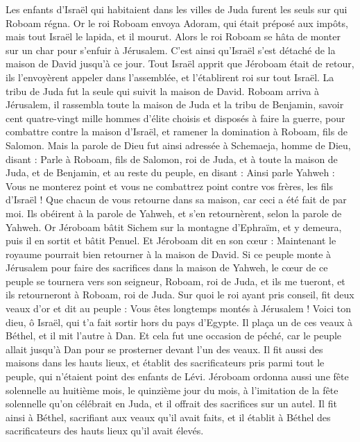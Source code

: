 \begin{multicols}{2}
Les enfants d'Israël qui habitaient dans les villes de Juda furent les seuls sur qui Roboam régna.
Or le roi Roboam envoya Adoram, qui était préposé aux impôts, mais tout Israël le lapida, et il mourut. Alors le roi Roboam se hâta de monter sur un char pour s'enfuir à Jérusalem.
C'est ainsi qu'Israël s'est détaché de la maison de David jusqu'à ce jour.
Tout Israël apprit que Jéroboam était de retour, ils l'envoyèrent appeler dans l'assemblée, et l'établirent roi sur tout Israël. La tribu de Juda fut la seule qui suivit la maison de David.
Roboam arriva à Jérusalem, il rassembla toute la maison de Juda et la tribu de Benjamin, savoir cent quatre-vingt mille hommes d'élite choisis et disposés à faire la guerre, pour combattre contre la maison d'Israël, et ramener la domination à Roboam, fils de Salomon.
Mais la parole de Dieu fut ainsi adressée à Schemaeja, homme de Dieu, disant :
Parle à Roboam, fils de Salomon, roi de Juda, et à toute la maison de Juda, et de Benjamin, et au reste du peuple, en disant :
Ainsi parle Yahweh : Vous ne monterez point et vous ne combattrez point contre vos frères, les fils d'Israël ! Que chacun de vous retourne dans sa maison, car ceci a été fait de par moi. Ils obéirent à la parole de Yahweh, et s'en retournèrent, selon la parole de Yahweh.
Or Jéroboam bâtit Sichem sur la montagne d'Ephraïm, et y demeura, puis il en sortit et bâtit Penuel.
Et Jéroboam dit en son cœur : Maintenant le royaume pourrait bien retourner à la maison de David.
Si ce peuple monte à Jérusalem pour faire des sacrifices dans la maison de Yahweh, le cœur de ce peuple se tournera vers son seigneur, Roboam, roi de Juda, et ils me tueront, et ils retourneront à Roboam, roi de Juda.
Sur quoi le roi ayant pris conseil, fit deux veaux d'or et dit au peuple : Vous êtes longtemps montés à Jérusalem ! Voici ton dieu, ô Israël, qui t'a fait sortir hors du pays d'Egypte.
Il plaça un de ces veaux à Béthel, et il mit l'autre à Dan.
Et cela fut une occasion de péché, car le peuple allait jusqu'à Dan pour se prosterner devant l'un des veaux.
Il fit aussi des maisons dans les hauts lieux, et établit des sacrificateurs pris parmi tout le peuple, qui n'étaient point des enfants de Lévi.
Jéroboam ordonna aussi une fête solennelle au huitième mois, le quinzième jour du mois, à l'imitation de la fête solennelle qu'on célébrait en Juda, et il offrait des sacrifices sur un autel. Il fit ainsi à Béthel, sacrifiant aux veaux qu'il avait faits, et il établit à Béthel des sacrificateurs des hauts lieux qu'il avait élevés.

\end{multicols}
